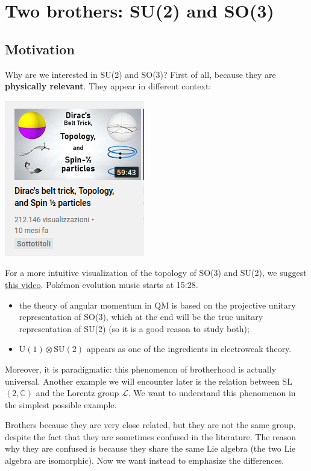 \documentclass[../main.tex]{subfiles}
\begin{document}
\setchapterpreamble[u]{\margintoc}
\chapter[Two brothers: SU(2) and SO(3)]{Two brothers: SU(2) and SO(3)\footnotemark[0]}
\section{Motivation}
Why are we interested in SU(2) and SO(3)? First of all, because they are \textbf{physically relevant}. They appear in different context: 
\begin{marginfigure}[10mm]
    \includegraphics[]{images/videoSO(3).png}
    \caption[Video from YouTube]{For a more intuitive visualization of the topology of SO(3) and SU(2), we suggest \href{https://www.youtube.com/watch?v=ACZC_XEyg9U}{this video}. Pokémon evolution music starts at 15:28.}
\end{marginfigure}
\begin{itemize}
    \item the theory of angular momentum in QM is based on the projective unitary representation of SO(3), which at the end will be the true unitary representation of SU(2) (so it is a good reason to study both);
 \item $\textrm{U}(1)\otimes\textrm{SU}(2)$ appears as one of the ingredients in electroweak theory.
\end{itemize}
Moreover, it is paradigmatic: this phenomenon of brotherhood is actually universal. Another example we will encounter later is the relation between SL$(2,\mathbb{C})$ and the Lorentz group $\mathcal{L}$. We want to understand this phenomenon in the simplest possible example.

Brothers because they are very close related, but they are not the same group, despite the fact that they are sometimes confused in the literature. The reason why they are confused is because they share the same Lie algebra (the two Lie algebra are isomorphic). Now we want instead to emphasize the differences.
\end{document}
